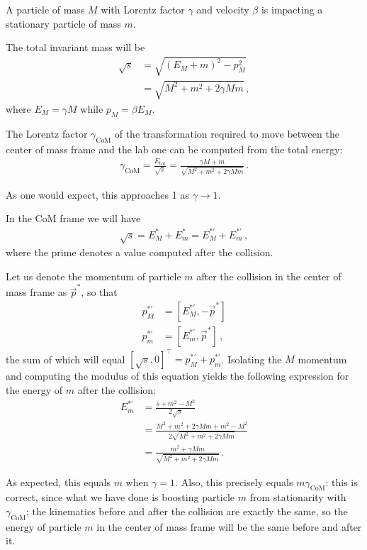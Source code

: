 \documentclass[main.tex]{subfiles}
\begin{document}
\begin{extracontent}
A particle of mass \(M\) with Lorentz factor \(\gamma \) and velocity \(\beta \) is impacting a stationary particle of mass \(m\). 

The total invariant mass will be 
%
\begin{align}
\sqrt{s} &= \sqrt{(E_M + m)^2  - p_M^2}  \\
&= \sqrt{M^2 + m^2 + 2 \gamma Mm}
\,,
\end{align}
%
where \(E_M = \gamma M\) while \(p_M = \beta E_M\).

The Lorentz factor \(\gamma _{\text{CoM}}\) of the transformation required to move between the center of mass frame and the lab one can be computed from the total energy: 
%
\begin{align}
\gamma _{\text{CoM}} = \frac{E_{\text{tot}}}{\sqrt{s}} = \frac{\gamma M + m}{\sqrt{M^2 + m^2 + 2 \gamma Mm}}
\,.
\end{align}

As one would expect, this approaches 1 as \(\gamma \to 1\). 

In the CoM frame we will have 
%
\begin{align}
\sqrt{s} = E^{*}_M + E^{*}_m = E^{* \prime}_M + E^{* \prime}_m
\,,
\end{align}
%
where the prime denotes a value computed after the collision. 

Let us denote the momentum of particle \(m\) after the collision in the center of mass frame as \(\vec{p}^{*}\), so that 
%
\begin{align}
p_M^{* \prime} &= [E^{* \prime}_M, -\vec{p}^{*}] \\
p_m^{* \prime} &= [E^{* \prime}_m, \vec{p}^{*}]
\,,
\end{align}
%
the sum of which will equal \([\sqrt{s}, 0]^{\top} = p^{*\prime}_M + p^{*\prime}_m\).
Isolating the \(M\) momentum and computing the modulus of this equation yields the following expression for the energy of \(m\) after the collision:
%
\begin{align}
E_m^{*\prime} &= \frac{s + m^2 - M^2}{2 \sqrt{s}}  \\
&= \frac{M^2 + m^2 + 2 \gamma Mm + m^2 - M^2}{2 \sqrt{M^2 + m^2 + 2 \gamma Mm}}  \\
&= \frac{m^2 + \gamma Mm}{\sqrt{M^2 + m^2 + 2 \gamma Mm}}
\,.
\end{align}

As expected, this equals \(m\) when \(\gamma = 1\). 
Also, this precisely equals \(m \gamma _{\text{CoM}}\): this is correct, since what we have done is boosting particle \(m\) from stationarity with \(\gamma _{\text{CoM}}\); the kinematics before and after the collision are exactly the same, so the energy of particle \(m\) in the center of mass frame will be the same before and after it. 


\end{extracontent}
\end{document}
